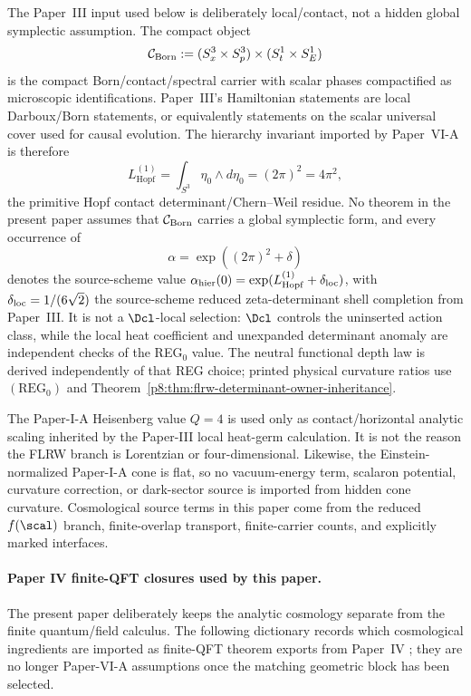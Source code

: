 \documentclass[12pt,a4paper]{article}
\begin{document}
\begin{remark}
\label{p8:rem:p3-contact-residue-interface}
The Paper~III input used below is deliberately local/contact, not a hidden global symplectic assumption.  The compact object
\[
\mathcal C_{\rm Born}:=(S^3_x\times S^3_p)\times(S^1_t\times S^1_E)
\]
is the compact Born/contact/spectral carrier with scalar phases compactified as microscopic identifications.  Paper~III's Hamiltonian statements are local Darboux/Born statements, or equivalently statements on the scalar universal cover used for causal evolution.  The hierarchy invariant imported by Paper~VI-A is therefore
\[
L_{\mathrm{Hopf}}^{(1)}
=\int_{S^3}\eta_0\wedge d\eta_0
=(2\pi)^2=4\pi^2,
\]
the primitive Hopf contact determinant/Chern--Weil residue.  No theorem in the present paper assumes that \(\mathcal C_{\rm Born}\) carries a global symplectic form, and every occurrence of
\[
\alpha=\exp\!\left((2\pi)^2+\delta\right)
\]
denotes the source-scheme value
\(\alpha_{\rm hier}(0)=\exp(L_{\mathrm{Hopf}}^{(1)}+\delta_{\rm loc})\),
with \(\delta_{\rm loc}=1/(6\sqrt2)\) the source-scheme reduced
zeta-determinant shell completion from Paper~III.  It is not a \(\Dcl\)-local
selection: \(\Dcl\) controls the uninserted action class, while the local heat
coefficient and unexpanded determinant anomaly are independent checks of the
REG$_0$ value.  The neutral functional depth law is derived independently of
that REG choice; printed physical curvature ratios use \((\mathrm{REG}_0)\)
and Theorem~\ref{p8:thm:flrw-determinant-owner-inheritance}.
\end{remark}

\begin{remark}
\label{p8:rem:q4-flat-cone-cosmology-scope}
The Paper-I-A Heisenberg value \(Q=4\) is used only as contact/horizontal analytic
scaling inherited by the Paper-III local heat-germ calculation.  It is not the
reason the FLRW branch is Lorentzian or four-dimensional.  Likewise, the
Einstein-normalized Paper-I-A cone is flat, so no vacuum-energy term, scalaron
potential, curvature correction, or dark-sector source is imported from hidden
cone curvature.  Cosmological source terms in this paper come from the reduced
\(f(\scal)\) branch, finite-overlap transport, finite-carrier counts, and explicitly
marked interfaces.
\end{remark}


\paragraph{Paper IV finite-QFT closures used by this paper.}
The present paper deliberately keeps the analytic cosmology separate from the finite quantum/field calculus.  The following dictionary records which cosmological ingredients are imported as finite-QFT theorem exports from Paper~IV \cite{Kugelmann2026e}; they are no longer Paper-VI-A assumptions once the matching geometric block has been selected.
\end{document}
